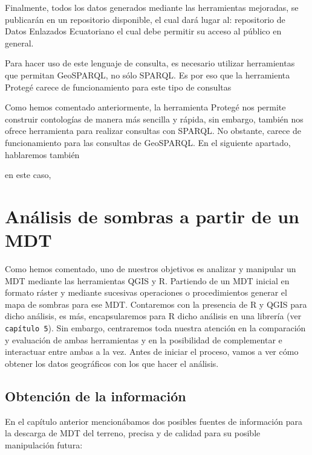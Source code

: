 Finalmente, todos los datos generados mediante las herramientas mejoradas, se publicarán en un repositorio disponible, el cual dará lugar al: repositorio de Datos Enlazados Ecuatoriano el cual debe permitir su acceso al público en general. 



Para hacer uso de este lenguaje de consulta, es necesario utilizar herramientas que permitan GeoSPARQL, no sólo SPARQL. Es por eso que la herramienta Protegé carece de funcionamiento para este tipo de consultas

Como hemos comentado anteriormente, la herramienta Protegé nos permite construir contologías de manera más sencilla y rápida, sin embargo, también nos ofrece herramienta para realizar consultas con SPARQL. No obstante, carece de funcionamiento para las consultas de GeoSPARQL. En el siguiente apartado, hablaremos también 

en este caso, 


\section{Análisis de sombras a partir de un MDT}

Como hemos comentado, uno de nuestros objetivos es analizar y manipular un MDT mediante las herramientas QGIS y R. Partiendo de un MDT inicial en formato ráster y mediante sucesivas operaciones o procedimientos generar el mapa de sombras para ese MDT. Contaremos con la presencia de R y QGIS para dicho análisis, es más, encapsularemos para R dicho análisis en una librería (ver \texttt{capítulo 5}). Sin embargo, centraremos toda nuestra atención en la comparación y evaluación de ambas herramientas y en la posibilidad de complementar e interactuar entre ambas a la vez. Antes de iniciar el proceso, vamos a ver cómo obtener los datos geográficos con los que hacer el análisis.


\subsection{Obtención de la información}

En el capítulo anterior mencionábamos dos posibles fuentes de información para la descarga de MDT del terreno, precisa y de calidad para su posible manipulación futura:

